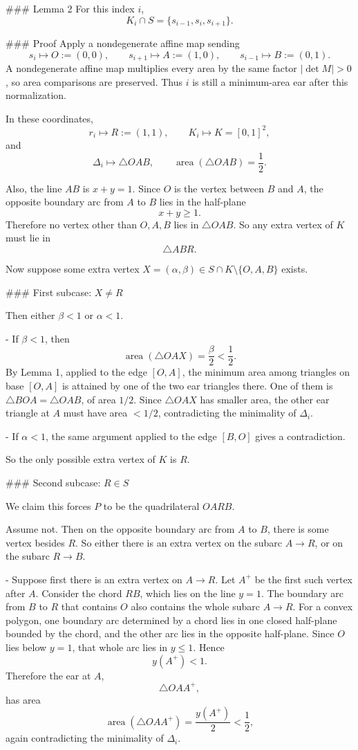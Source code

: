 ### Lemma 2
For this index \(i\),
\[
K_i\cap S=\{s_{i-1},s_i,s_{i+1}\}.
\]

### Proof
Apply a nondegenerate affine map sending
\[
s_i\mapsto O:=(0,0),\qquad
s_{i+1}\mapsto A:=(1,0),\qquad
s_{i-1}\mapsto B:=(0,1).
\]
A nondegenerate affine map multiplies every area by the same factor \(|\det M|>0\), so area comparisons are preserved. Thus \(i\) is still a minimum-area ear after this normalization.

In these coordinates,
\[
r_i\mapsto R:=(1,1),
\qquad
K_i\mapsto K=[0,1]^2,
\]
and
\[
\Delta_i\mapsto \triangle OAB,
\qquad
\operatorname{area}(\triangle OAB)=\frac12.
\]

Also, the line \(AB\) is \(x+y=1\). Since \(O\) is the vertex between \(B\) and \(A\), the opposite boundary arc from \(A\) to \(B\) lies in the half-plane
\[
x+y\ge 1.
\]
Therefore no vertex other than \(O,A,B\) lies in \(\triangle OAB\). So any extra vertex of \(K\) must lie in
\[
\triangle ABR.
\]

Now suppose some extra vertex \(X=(\alpha,\beta)\in S\cap K\setminus\{O,A,B\}\) exists.

### First subcase: \(X\neq R\)

Then either \(\beta<1\) or \(\alpha<1\).

- If \(\beta<1\), then
  \[
  \operatorname{area}(\triangle OAX)=\frac{\beta}{2}<\frac12.
  \]
  By Lemma 1, applied to the edge \([O,A]\), the minimum area among triangles on base \([O,A]\) is attained by one of the two ear triangles there. One of them is \(\triangle BOA=\triangle OAB\), of area \(1/2\). Since \(\triangle OAX\) has smaller area, the other ear triangle at \(A\) must have area \(<1/2\), contradicting the minimality of \(\Delta_i\).

- If \(\alpha<1\), the same argument applied to the edge \([B,O]\) gives a contradiction.

So the only possible extra vertex of \(K\) is \(R\).

### Second subcase: \(R\in S\)

We claim this forces \(P\) to be the quadrilateral \(OARB\).

Assume not. Then on the opposite boundary arc from \(A\) to \(B\), there is some vertex besides \(R\). So either there is an extra vertex on the subarc \(A\to R\), or on the subarc \(R\to B\).

- Suppose first there is an extra vertex on \(A\to R\). Let \(A^+\) be the first such vertex after \(A\).  
  Consider the chord \(RB\), which lies on the line \(y=1\). The boundary arc from \(B\) to \(R\) that contains \(O\) also contains the whole subarc \(A\to R\). For a convex polygon, one boundary arc determined by a chord lies in one closed half-plane bounded by the chord, and the other arc lies in the opposite half-plane. Since \(O\) lies below \(y=1\), that whole arc lies in \(y\le 1\). Hence
  \[
  y(A^+)<1.
  \]
  Therefore the ear at \(A\),
  \[
  \triangle OAA^+,
  \]
  has area
  \[
  \operatorname{area}(\triangle OAA^+)=\frac{y(A^+)}{2}<\frac12,
  \]
  again contradicting the minimality of \(\Delta_i\).

